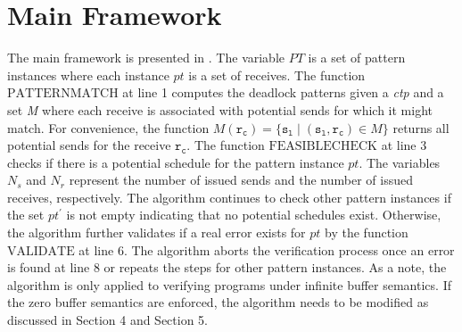 \section{Main Framework}



The main framework is presented in . The variable $\mathit{PT}$ is a set of pattern instances where each instance $\mathit{pt}$ is a set of receives. The function $\mathrm{PATTERNMATCH}$ at line 1 computes the 
deadlock patterns given a \emph{ctp} and a set \emph{M} where each receive is associated with potential sends for which it might match. For convenience, the function $\mathit{M}(\mathtt{r_c}) = \{\mathtt{s_l}\mid(\mathtt{s_l},\mathtt{r_c})\in\mathit{M}\}$ returns all potential sends for the receive $\mathtt{r_c}$.  
The function $\mathrm{FEASIBLECHECK}$ at line 3 checks if there is a potential schedule for the pattern instance $\mathit{pt}$.  
The variables $\mathit{N_s}$ and $\mathit{N_r}$ represent the number of issued sends and the number of issued receives, respectively.
The algorithm continues to check other pattern instances if the set $\mathit{pt^\prime}$ is not empty indicating that no potential schedules exist. Otherwise, the algorithm further validates if a real error exists for $\mathit{pt}$ by the function $\mathrm{VALIDATE}$ at line 6. The algorithm aborts the verification process once an error is found at line 8 or repeats the steps for other pattern instances.
As a note, the algorithm is only applied to verifying programs under infinite buffer semantics. If the zero buffer semantics are enforced, the algorithm needs to be modified as discussed in Section 4 and Section 5. 


